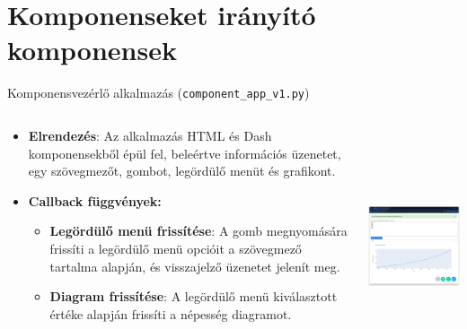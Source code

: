 \documentclass[english, aspectratio=169]{beamer}
\makeatletter
\let\origtableofcontents=\tableofcontents
\def\tableofcontents{\@ifnextchar[{\origtableofcontents}{\gobbletableofcontents}}
\def\gobbletableofcontents#1{\origtableofcontents}
\makeatother
\begin{document}
	\section{Komponenseket irányító komponensek}
	
	\begin{frame}{}
		\tableofcontents[currentsection]
	\end{frame}
	
	\begin{frame}{Komponensvezérlő alkalmazás (\texttt{component\_app\_v1.py})}
		\begin{columns}
			\begin{column}{.5\textwidth}
				\begin{itemize}
					\item \textbf{Elrendezés}: Az alkalmazás HTML és Dash komponensekből épül fel, beleértve információs üzenetet, egy szövegmezőt, gombot, legördülő menüt és grafikont.
					\item \textbf{Callback függvények:}
					\begin{itemize}
						\item \textbf{Legördülő menü frissítése}: A gomb megnyomására frissíti a legördülő menü opcióit a szövegmező tartalma alapján, és visszajelző üzenetet jelenít meg.
						\item \textbf{Diagram frissítése}: A legördülő menü kiválasztott értéke alapján frissíti a népesség diagramot.
					\end{itemize}
				\end{itemize}
			\end{column}
			\begin{column}{.5\textwidth}
				\begin{center}
					\includegraphics[width=7cm, height=7cm, keepaspectratio]{images/freq_23.png}
				\end{center}	
			\end{column}
		\end{columns}
	\end{frame}
	
\end{document}
